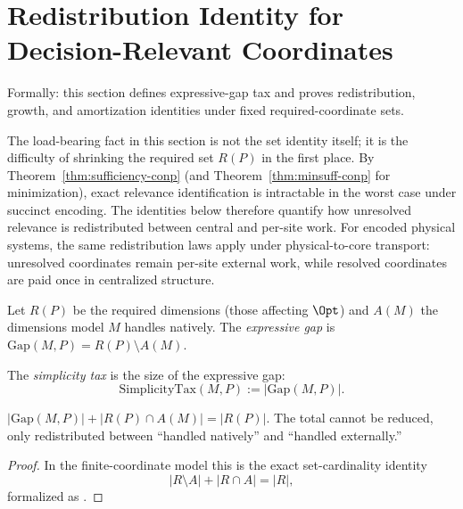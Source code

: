 \section{Redistribution Identity for Decision-Relevant Coordinates}\label{sec:simplicity-tax}

Formally: this section defines expressive-gap tax and proves redistribution, growth, and amortization identities under fixed required-coordinate sets.

The load-bearing fact in this section is not the set identity itself; it is the difficulty of shrinking the required set $R(P)$ in the first place. By Theorem~\ref{thm:sufficiency-conp} (and Theorem~\ref{thm:minsuff-conp} for minimization), exact relevance identification is intractable in the worst case under succinct encoding. The identities below therefore quantify how unresolved relevance is redistributed between central and per-site work.
For encoded physical systems, the same redistribution laws apply under physical-to-core transport: unresolved coordinates remain per-site external work, while resolved coordinates are paid once in centralized structure.

\begin{definition}
Let $R(P)$ be the required dimensions (those affecting $\Opt$) and $A(M)$ the dimensions model $M$ handles natively. The \emph{expressive gap} is $\text{Gap}(M,P) = R(P) \setminus A(M)$.
\end{definition}

\begin{definition}\label{def:simplicity-tax}
The \emph{simplicity tax} is the size of the expressive gap:
\[
\text{SimplicityTax}(M,P) := |\text{Gap}(M,P)|.
\]
\end{definition}

\begin{theorem}\label{thm:tax-conservation}
$|\text{Gap}(M, P)| + |R(P) \cap A(M)| = |R(P)|$. The total cannot be reduced, only redistributed between ``handled natively'' and ``handled externally.''
\end{theorem}

\begin{proof}
In the finite-coordinate model this is the exact set-cardinality identity
\[
|R\setminus A| + |R\cap A| = |R|,
\]
formalized as .
\end{proof}

